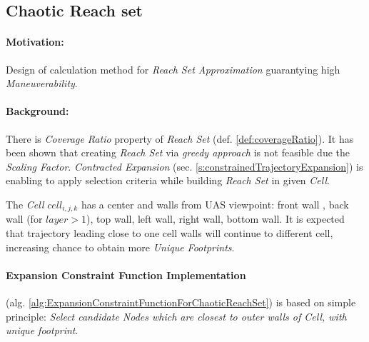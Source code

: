 \newpage
\subsection{Chaotic Reach set}\label{s:chaoticReachSet}

\paragraph{Motivation:} Design of calculation method for \emph{Reach Set Approximation} guarantying high \emph{Maneuverability}.

\paragraph{Background:}There is \emph{Coverage Ratio} property of \emph{Reach Set} (def. \ref{def:coverageRatio}). It has been shown that creating \emph{Reach Set} via \emph{greedy approach} is not feasible due the \emph{Scaling Factor}.  \emph{Contracted Expansion} (sec. \ref{s:constrainedTrajectoryExpansion}) is enabling to apply selection criteria while building \emph{Reach Set} in given \emph{Cell}. 

The \emph{Cell} $cell_{i,j,k}$ has a center and walls from UAS viewpoint: front wall , back wall (for $layer > 1$), top wall, left wall, right wall, bottom wall. It is expected that trajectory leading close to one cell walls will continue to different cell, increasing chance to obtain more \emph{Unique Footprints}. 

\paragraph{Expansion Constraint Function Implementation} (alg. \ref{alg:ExpansionConstraintFunctionForChaoticReachSet}) is based on simple principle: \emph{Select candidate Nodes which are  closest to outer walls of Cell, with unique footprint}.

